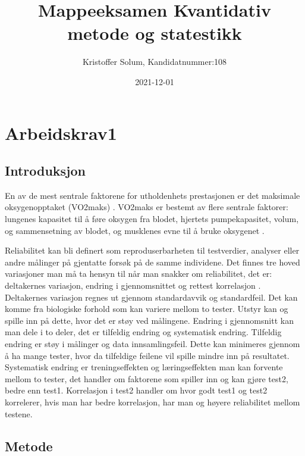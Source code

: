 \documentclass[
]{book}
\title{Mappeeksamen Kvantidativ metode og statestikk}
\author{Kristoffer Solum, Kandidatnummer:108}
\date{2021-12-01}
\begin{document}
\maketitle

{
\setcounter{tocdepth}{1}
\tableofcontents
}
\hypertarget{arbeidskrav1}{%
\chapter{Arbeidskrav1}\label{arbeidskrav1}}

\hypertarget{introduksjon}{%
\section{Introduksjon}\label{introduksjon}}

En av de mest sentrale faktorene for utholdenhets prestasjonen er det maksimale oksygenopptaket (VO2maks) \citet{bassett2000}. VO2maks er bestemt av flere sentrale faktorer: lungenes kapasitet til å føre oksygen fra blodet, hjertets pumpekapasitet, volum, og sammensetning av blodet, og musklenes evne til å bruke oksygenet \citet{bassett2000}.

Reliabilitet kan bli definert som reproduserbarheten til testverdier, analyser eller andre målinger på gjentatte forsøk på de samme individene. Det finnes tre hoved variasjoner man må ta hensyn til når man snakker om reliabilitet, det er: deltakernes variasjon, endring i gjennomsnittet og rettest korrelasjon \citet{hopkins2000}. Deltakernes variasjon regnes ut gjennom standardavvik og standardfeil. Det kan komme fra biologiske forhold som kan variere mellom to tester. Utstyr kan og spille inn på dette, hvor det er støy ved målingene. Endring i gjennomsnitt kan man dele i to deler, det er tilfeldig endring og systematisk endring. Tilfeldig endring er støy i målinger og data innsamlingsfeil. Dette kan minimeres gjennom å ha mange tester, hvor da tilfeldige feilene vil spille mindre inn på resultatet. Systematisk endring er treningseffekten og læringseffekten man kan forvente mellom to tester, det handler om faktorene som spiller inn og kan gjøre test2, bedre enn test1. Korrelasjon i test2 handler om hvor godt test1 og test2 korrelerer, hvis man har bedre korrelasjon, har man og høyere reliabilitet mellom testene.

\hypertarget{metode}{%
\section{Metode}\label{metode}}
\end{document}
